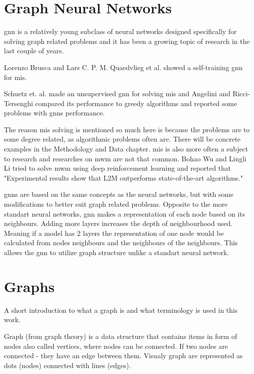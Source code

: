 \section{Graph Neural Networks}

\gls{gnn} is a relatively young subclass of neural networks designed specifically for solving graph related problems and it has been a growing topic of research in the last couple of years.

Lorenzo Brusca and Lars C. P. M. Quaedvlieg et al. \cite{brusca2023maximum} showed a self-training \gls{gnn} for \gls{mis}. 

Schuetz et. al. made an unsupervised \gls{gnn} \cite{Schuetz2022} for solving \gls{mis} and Angelini and Ricci-Tersenghi \cite{Angelini2022} compared  its performance to greedy algorithms and reported some problems with \gls{gnn}s performance.

The reason \gls{mis} solving is mentioned so much here is because the problems are to some degree related, as algorithmic problems often are. There will be concrete examples in the Methodology and Data chapter. \gls{mis} is also more often a subject to research and researches on \gls{mwm} are not that common. Bohao Wu and Lingli Li tried to solve \gls{mwm} using deep reinforcement learning \cite{WU2022400} and reported that "Experimental results show that L2M outperforms state-of-the-art algorithms."

\gls{gnn}s are based on the same concepts as the neural networks, but with some modifications to better suit graph related problems. Opposite to the more standart neural networks, \gls{gnn} makes a representation of each node based on its neighbours. Adding more layers increases the depth of neighbourhood used. Meaning if a model has 2 layers the representation of one node would be calculated from nodes neighbours and the neighbours of the neighbours. This allows the \gls{gnn} to utilize graph structure unlike a standart neural network.

\section{Graphs}

A short introduction to what a graph is and what terminology is used in this work.

Graph (from graph theory) is a data structure that contains items in form of nodes also called vertices, where nodes can be connected. If two nodes are connected - they have an edge between them. Visualy graph are represented as dots (nodes) connected with lines (edges).


